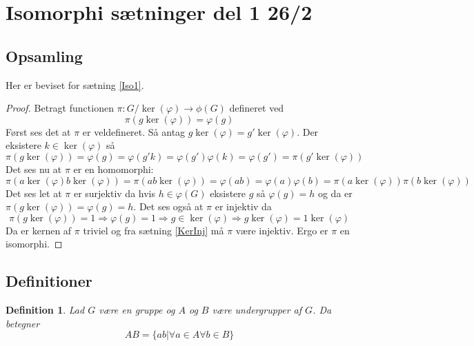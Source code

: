 \documentclass{article}
\newcommand{\imp}{\Rightarrow}
\newcommand{\too}{\rightarrow}
\newtheorem{defi}{Definition}
\begin{document}
	\section*{Isomorphi sætninger del 1 26/2}
		\subsection*{Opsamling}
		Her er beviset for sætning \ref{Iso1}.
		\begin{proof}
			Betragt functionen $\pi: G/\ker(\varphi) \too \phi(G)$ defineret ved
			$$\pi(g\ker(\varphi)) = \varphi(g)$$
			Først ses det at $\pi$ er veldefineret. Så antag $g\ker(\varphi) = g'\ker(\varphi)$.
			Der eksistere $k \in \ker(\varphi)$ så
			$$\pi(g\ker(\varphi)) = \varphi(g) = \varphi(g'k) = \varphi(g')\varphi(k)=\varphi(g') =
			\pi(g'\ker(\varphi))$$
			Det ses nu at $\pi$ er en homomorphi:
			$$\pi(a\ker(\varphi)b\ker(\varphi)) = \pi(ab\ker(\varphi)) = \varphi(ab) =
			\varphi(a)\varphi(b)=\pi(a\ker(\varphi))\pi(b\ker(\varphi))$$
			Det ses let at $\pi$ er surjektiv da hvis $h \in \varphi(G)$ eksistere $g$
			så $\varphi(g) = h$ og da er $\pi(g\ker(\varphi)) = \varphi(g) = h$.
			Det ses også at $\pi$ er injektiv da
			$$\pi(g\ker(\varphi)) = 1 \imp \varphi(g) = 1 \imp g \in \ker(\varphi) \imp
			g\ker(\varphi) = 1\ker(\varphi)$$
			Da er kernen af $\pi$ triviel og fra sætning \ref{KerInj} må $\pi$ være injektiv.
			Ergo er $\pi$ en isomorphi.
		\end{proof}
		\subsection*{Definitioner}
		\begin{defi}
			Lad $G$ være en gruppe og $A$ og $B$ være undergrupper af $G$. Da betegner
			$$AB = \{ab | \forall a \in A \forall b \in B\}$$
		\end{defi}
\end{document}
